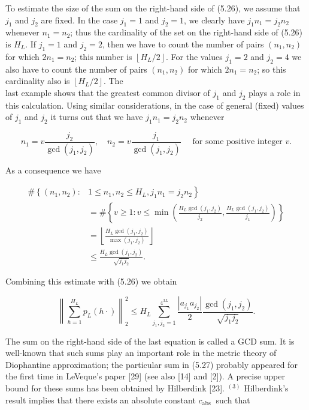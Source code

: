 \documentclass[10pt]{article}
\newcommand{\1}{\mathbf{1}}
\begin{document}
To estimate the size of the sum on the right-hand side of (5.26), we assume that $j_{1}$ and $j_{2}$ are fixed. In the case $j_{1}=1$ and $j_{2}=1$, we clearly have $j_{1} n_{1}=j_{2} n_{2}$ whenever $n_{1}=n_{2}$; thus the cardinality of the set on the right-hand side of (5.26) is $H_{L}$. If $j_{1}=1$ and $j_{2}=2$, then we have to count the number of pairs $\left(n_{1}, n_{2}\right)$ for which $2 n_{1}=n_{2}$; this number is $\left\lfloor H_{L} / 2\right\rfloor$. For the values $j_{1}=2$ and $j_{2}=4$ we also have to count the number of pairs $\left(n_{1}, n_{2}\right)$ for which $2 n_{1}=n_{2}$; so this cardinality also is $\left\lfloor H_{L} / 2\right\rfloor$. The\\
last example shows that the greatest common divisor of $j_{1}$ and $j_{2}$ plays a role in this calculation. Using similar considerations, in the case of general (fixed) values of $j_{1}$ and $j_{2}$ it turns out that we have $j_{1} n_{1}=j_{2} n_{2}$ whenever

$$
n_{1}=v \frac{j_{2}}{\operatorname{gcd}\left(j_{1}, j_{2}\right)}, \quad n_{2}=v \frac{j_{1}}{\operatorname{gcd}(j_1,j_2)} \quad \text { for some positive integer } v .
$$

As a consequence we have

$$
\begin{aligned}
\#\left\{\left(n_{1}, n_{2}\right):\right. & \left.1 \leqslant n_{1}, n_{2} \leqslant H_{L}, j_{1} n_{1}=j_{2} n_{2}\right\} \\
& =\#\left\{v \geqslant 1: v \leqslant \min \left(\frac{H_{L} \operatorname{gcd}\left(j_{1}, j_{2}\right)}{j_{2}}, \frac{H_{L} \operatorname{gcd}\left(j_{1}, j_{2}\right)}{j_{1}}\right)\right\} \\
& =\left\lfloor\frac{H_{L} \operatorname{gcd}\left(j_{1}, j_{2}\right)}{\max \left(j_{1}, j_{2}\right)}\right\rfloor \\
& \leqslant \frac{H_{L} \operatorname{gcd}\left(j_{1}, j_{2}\right)}{\sqrt{j_{1} j_{2}}} .
\end{aligned}
$$

Combining this estimate with (5.26) we obtain


\begin{equation*}
\left\|\sum_{h=1}^{H_{L}} p_{L}(h \cdot)\right\|_{2}^{2} \leqslant H_{L} \sum_{j_{1}, j_{2}=1}^{4^{3 L}} \frac{\left|a_{j_{1}} a_{j_{2}}\right|}{2} \frac{\operatorname{gcd}\left(j_{1}, j_{2}\right)}{\sqrt{j_{1} j_{2}}} . \tag{5.27}
\end{equation*}


The sum on the right-hand side of the last equation is called a GCD sum. It is well-known that such sums play an important role in the metric theory of Diophantine approximation; the particular sum in (5.27) probably appeared for the first time in LeVeque's paper [29] (see also [14] and [2]). A precise upper bound for these sums has been obtained by Hilberdink [23]. ${ }^{(3)}$ Hilberdink's result implies that there exists an absolute constant $c_{\text {abs }}$ such that
\end{document}
